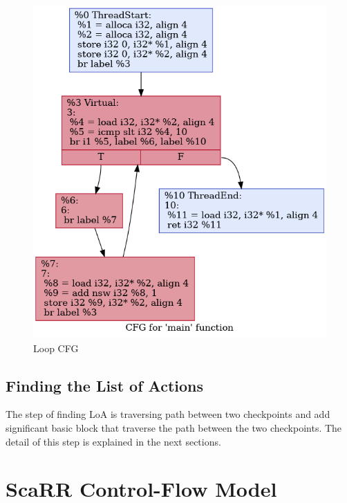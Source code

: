 \begin{figure}[htbp]
\centerline{\includegraphics[scale=.5]{Figures/04/simple-loop-checkpoints.png}}
\caption{Loop CFG}
\label{fig:simple-loop-checkpoints}
\end{figure}

\subsection{Finding the List of Actions}

The step of finding LoA is traversing path between two checkpoints and add significant basic block that traverse the path between the two checkpoints. The detail of this step is explained in the next sections.

\section{ScaRR Control-Flow Model} \label{sec:scarr-model}


